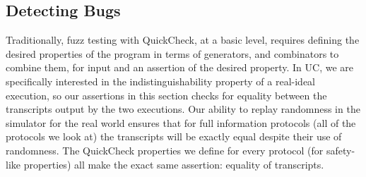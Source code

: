 
\subsection{Detecting Bugs}
Traditionally, fuzz testing with QuickCheck, at a basic level, requires
defining the desired properties of the program in terms of generators, and
combinators to combine them, for input and an assertion of the desired
property.  In UC, we are specifically interested in the indistinguishability
property of a real-ideal execution, so our assertions in this section checks
for equality between the transcripts output by the two executions.  Our ability
to replay randomness in the simulator for the real world ensures that for full
information protocols (all of the protocols we look at) the transcripts will be
exactly equal despite their use of randomness.  The QuickCheck properties we
define for every protocol (for safety-like properties) all make the exact same
assertion: equality of transcripts.

